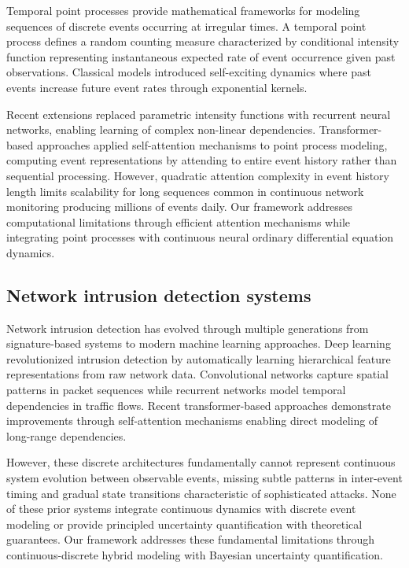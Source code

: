 \documentclass[10pt,journal,compsoc]{IEEEtran}
\begin{document}
Temporal point processes provide mathematical frameworks for modeling sequences of discrete events occurring at irregular times. A temporal point process defines a random counting measure characterized by conditional intensity function representing instantaneous expected rate of event occurrence given past observations. Classical models introduced self-exciting dynamics where past events increase future event rates through exponential kernels.

Recent extensions replaced parametric intensity functions with recurrent neural networks, enabling learning of complex non-linear dependencies. Transformer-based approaches applied self-attention mechanisms to point process modeling, computing event representations by attending to entire event history rather than sequential processing. However, quadratic attention complexity in event history length limits scalability for long sequences common in continuous network monitoring producing millions of events daily. Our framework addresses computational limitations through efficient attention mechanisms while integrating point processes with continuous neural ordinary differential equation dynamics.

\subsection{Network intrusion detection systems}

Network intrusion detection has evolved through multiple generations from signature-based systems to modern machine learning approaches. Deep learning revolutionized intrusion detection by automatically learning hierarchical feature representations from raw network data. Convolutional networks capture spatial patterns in packet sequences while recurrent networks model temporal dependencies in traffic flows. Recent transformer-based approaches demonstrate improvements through self-attention mechanisms enabling direct modeling of long-range dependencies.

However, these discrete architectures fundamentally cannot represent continuous system evolution between observable events, missing subtle patterns in inter-event timing and gradual state transitions characteristic of sophisticated attacks. None of these prior systems integrate continuous dynamics with discrete event modeling or provide principled uncertainty quantification with theoretical guarantees. Our framework addresses these fundamental limitations through continuous-discrete hybrid modeling with Bayesian uncertainty quantification.
\end{document}
